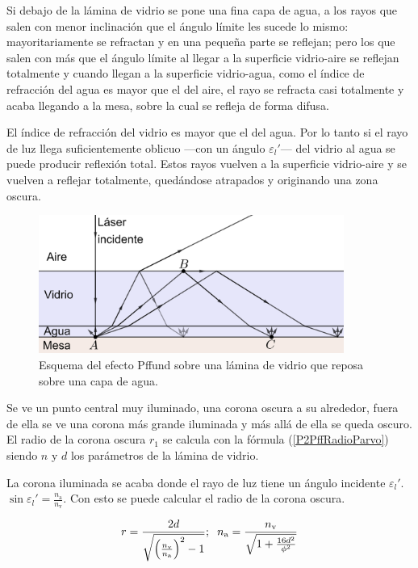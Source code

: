 \documentclass[12pt]{article}
\numberwithin{table}{section}
\numberwithin{figure}{section}
\numberwithin{equation}{section}
\DeclareMathOperator{\sen}{sin}
\begin{document}
Si debajo de la lámina de vidrio se pone una fina capa de agua, a los rayos que salen con menor inclinación que el ángulo límite les sucede lo mismo: mayoritariamente se refractan y en una pequeña parte se reflejan; pero los que salen con más que el ángulo límite al llegar a la superficie vidrio-aire se reflejan totalmente y cuando llegan a la superficie vidrio-agua, como el índice de refracción del agua es mayor que el del aire, el rayo se refracta casi totalmente y acaba llegando a la mesa, sobre la cual se refleja de forma difusa.

El índice de refracción del vidrio es mayor que el del agua. Por lo tanto si el rayo de luz llega suficientemente oblicuo ---con un ángulo $\varepsilon_l'$--- del vidrio al agua se puede producir reflexión total. Estos rayos vuelven a la superficie vidrio-aire y se vuelven a reflejar totalmente, quedándose atrapados y originando una zona oscura.

\begin{figure}[!ht]
	\small \centering \sffamily
	\begin{center}
		\includegraphics[width=10cm]{P2PffAgrio.png}
		\caption{Esquema del efecto Pffund sobre una lámina de vidrio que reposa sobre una capa de agua.}
		\label{P2PffAgrio}
	\end{center}
\end{figure}

Se ve un punto central muy iluminado, una corona oscura a su alrededor, fuera de ella se ve una corona más grande iluminada y más allá de ella se queda oscuro. El radio de la corona oscura $r_1$ se calcula con la fórmula (\ref{P2PffRadioParvo}) siendo $n$ y $d$ los parámetros de la lámina de vidrio.

La corona iluminada se acaba donde el rayo de luz tiene un ángulo incidente $\varepsilon_l'$. $\sen\varepsilon_l'=\frac{n_\text{a}}{n_\text{v}}$. Con esto se puede calcular el radio de la corona oscura.

\begin{equation}\label{P2PffRadioMagno}
	r=\frac{2d}{\sqrt{\left(\frac{n_\text{v}}{n_\text{a}}\right)^2-1}};\hspace{2mm}n_\text{a}=\frac{n_\text{v}}{\sqrt{1+\frac{16d^2}{\phi^2}}}
\end{equation}
\end{document}
